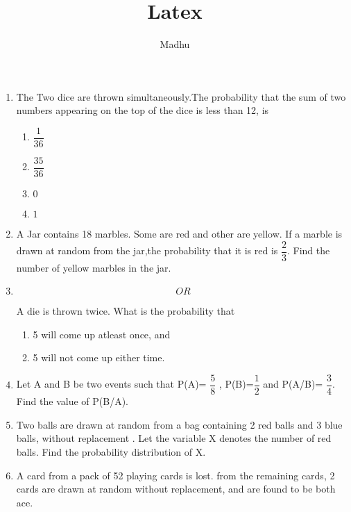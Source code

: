\documentclass[a4paper,12pt]{article}
\begin{document}
\title{Latex}
\author{Madhu}
\maketitle
{}

\begin{enumerate}

\item The Two dice are thrown simultaneously.The probability that the sum of two numbers appearing on the top of the dice is less than 12, is

\begin{enumerate}
\item \(\dfrac{1}{36}\) \\
\item \(\dfrac{35}{36}\)\\
\item $ 0 $\\
\item $ 1 $\\
\end{enumerate}


\item A Jar contains 18 marbles. Some are red and other are yellow. If a marble is drawn at random from the jar,the probability that it is red is $ \dfrac{2}{3} $. Find the number of yellow marbles in the jar.

\item [ ]$$ OR $$

A die is thrown twice. What is the probability that 
\begin{enumerate}
\item 5 will come up atleast once, and
\item 5 will not come up either time.
\end{enumerate}

\item Let A and B be two events such that P(A)= $ \dfrac{5}{8} $ , P(B)=$ \dfrac{1}{2} $ and P(A/B)= $\dfrac{3}{4} $. Find the value of P(B/A).

\item Two balls are drawn at random from a bag containing 2 red balls and 3 blue balls, without replacement . Let the variable X denotes the number of red balls. Find the probability distribution of X.

\item A card from a pack of 52 playing cards is lost. from the remaining cards, 2 cards are drawn at random without replacement, and are found to be both ace.


\end{enumerate}
\end{document}
